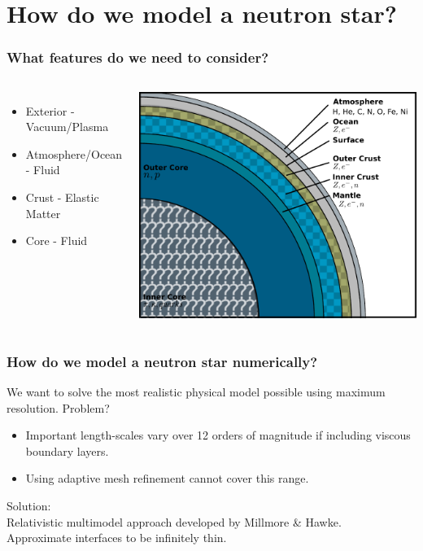 \documentclass{beamer}
\begin{document}
\section{How do we model a neutron star?}
\begin{frame}
\frametitle{What features do we need to consider?}
\begin{columns}
\begin{itemize}
\item{Exterior - Vacuum/Plasma}
\item{Atmosphere/Ocean - Fluid}
\item{Crust - Elastic Matter}
\item{Core - Fluid}
\end{itemize}
\includegraphics[width=\textwidth]{../images/neutron_star_structure}
\end{columns}
\end{frame}
\begin{frame}
\frametitle{How do we model a neutron star numerically?}
We want to solve the most realistic physical model possible using maximum resolution. Problem?
\begin{itemize}
\item{Important length-scales vary over 12 orders of magnitude if including viscous boundary layers.}
\item{Using adaptive mesh refinement cannot cover this range.}
\end{itemize}
Solution: \\
Relativistic multimodel approach developed by Millmore \& Hawke. \\
Approximate interfaces to be infinitely thin.
\end{frame}
\end{document}
